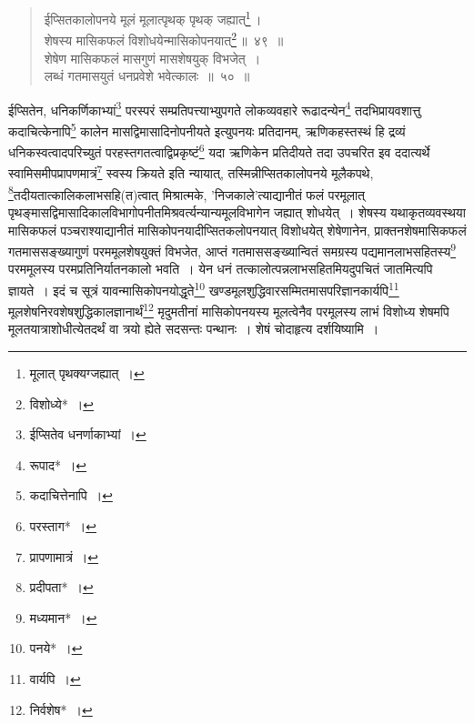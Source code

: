 \documentclass[10pt, openany]{book}
\begin{document}
{\vspace{0.3cm}{करणसूत्रमार्याद्वयम्\textemdash}

 \label{49}
\begin{quote}
    
{\bs  ईप्सितकालोपनये मूलं मूलात्पृथक् पृथक् जह्यात्\renewcommand{\thefootnote}{\s ९}\footnote{\s मूलात् पृथक्यग्जह्यात्~।}\,। \\
 शेषस्य मासिकफलं विशोधयेन्मासिकोपनयात्\renewcommand{\thefootnote}{\s १०}\footnote{\s विशोध्ये*~।}\,॥~४९~॥ \\
 शेषेण मासिकफलं मासगुणं मासशेषयुक् विभजेत्~। \\
 लब्धं गतमासयुतं धनप्रवेशे भवेत्कालः~॥~५०~॥} \end{quote}

\newpage

{ईप्सितेन, धनिकर्णिकाभ्यां\renewcommand{\thefootnote}{\s १}\footnote{\s ईप्सितेव धनर्णाकाभ्यां~।}  परस्परं सम्प्रतिपत्त्याभ्युपगते
लोकव्यवहारे रूढादन्येन\renewcommand{\thefootnote}{\s २}\footnote{\s रूपाद*~।}}
{तदभिप्रायवशात्तु कदाचित्केनापि\renewcommand{\thefootnote}{\s ३}\footnote{\s कदाचित्तेनापि~।} कालेन मासद्विमासादिनोपनीयते
इत्युपनयः प्रतिदानम्,}
{ऋणिकहस्तस्थं हि द्रव्यं धनिकस्वत्वादपरिच्युतं
परहस्तगतत्वाद्विप्रकृष्टं\renewcommand{\thefootnote}{\s ४}\footnote{\s परस्ताग*~।} यदा ऋणिकेन}
{प्रतिदीयते तदा उपचरित इव ददात्यर्थे स्वामिसमीपप्रापणमात्रं\renewcommand{\thefootnote}{\s ५}\footnote{\s *प्रापणामात्रं~।} स्वस्य
क्रियते इति न्यायात्,}
{तस्मिन्नीप्सितकालोपनये मूलैकपथे, \renewcommand{\thefootnote}{\s ६}\footnote{\s प्रदीपता*~।}तदीयतात्कालिकलाभसहि(त)त्वात्
मिश्रात्मके, 'निजकाले'त्याद्यानीतं फलं परमूलात्
पृथङ्मासद्विमासादिकालविभागोपनीतमिश्रवर्त्यन्यान्यमूलविभागेन}
{जह्यात् शोधयेत्~। शेषस्य \;यथाकृतव्यवस्थया \;मासिकफलं \;पञ्चराश्याद्यानीतं \;मासिकोपनयादीप्सितकलोपनयात् विशोधयेत् शेषेणानेन, प्राक्तनशेषमासिकफलं
गतमाससङ्ख्यागुणं}
{परममूलशेषयुक्तं विभजेत, आप्तं गतमाससङ्ख्यान्वितं समग्रस्य
पद्यमानलाभसहितस्य\renewcommand{\thefootnote}{\s ७}\footnote{\s मध्यमान*~।}}
{परममूलस्य परमप्रतिनिर्यातनकालो भवति~। येन धनं
तत्कालोत्पन्नलाभसहितमियदुपचितं जातमित्यपि ज्ञायते~। इदं च सूत्रं यावन्मासिकोपनयोद्धृते\renewcommand{\thefootnote}{\s ८}\footnote{\s *पनये*~।}
खण्डमूलशुद्धिवारसम्मितमासपरिज्ञानकार्यपि\renewcommand{\thefootnote}{\s ९}\footnote{\s *वार्यपि~।} मूलशेषनिरवशेषशुद्धिकालज्ञानार्थं\renewcommand{\thefootnote}{\s १०}\footnote{\s *निर्वशेष*~।} मृदुमतीनां
मासिकोपनयस्य मूलत्वेनैव परमूलस्य}
{लाभं विशोध्य शेषमपि मूलतयात्राशोधीत्येतदर्थं वा त्रयो ह्येते सदसन्तः
पन्थानः~। शेषं}
{चोदाहृत्य दर्शयिष्यामि~।}

}
\end{document}
